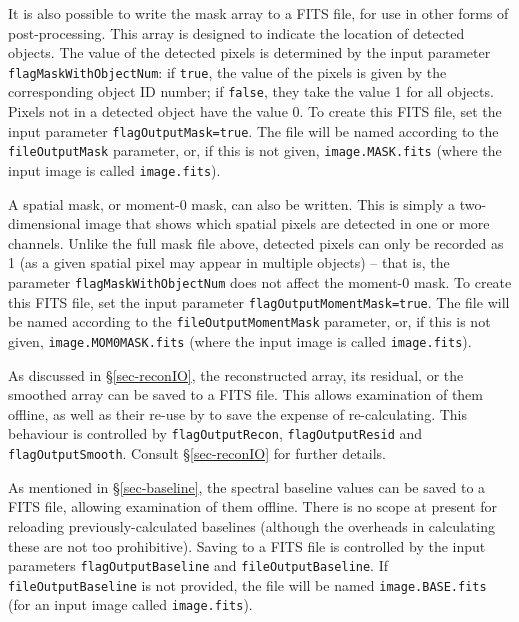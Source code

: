 \label{sec-maskOut}

It is also possible to write the mask array to a FITS file, for use in
other forms of post-processing. This array is designed to indicate the
location of detected objects. The value of the detected pixels is
determined by the input parameter \texttt{flagMaskWithObjectNum}: if
\texttt{true}, the value of the pixels is given by the corresponding
object ID number; if \texttt{false}, they take the value 1 for all
objects. Pixels not in a detected object have the value 0. To create
this FITS file, set the input parameter
\texttt{flagOutputMask=true}. The file will be named according to the
\texttt{fileOutputMask} parameter, or, if this is not given,
\texttt{image.MASK.fits} (where the input image is called
\texttt{image.fits}).

A spatial mask, or moment-0 mask, can also be written. This is simply
a two-dimensional image that shows which spatial pixels are detected
in one or more channels. Unlike the full mask file above, detected
pixels can only be recorded as 1 (as a given spatial pixel may appear
in multiple objects) -- that is, the parameter
\texttt{flagMaskWithObjectNum} does not affect the moment-0 mask. To
create this FITS file, set the input parameter
\texttt{flagOutputMomentMask=true}. The file will be named according
to the \texttt{fileOutputMomentMask} parameter, or, if this is not
given, \texttt{image.MOM0MASK.fits} (where the input image is called
\texttt{image.fits}).

\label{sec-reconOut}

As discussed in \S\ref{sec-reconIO}, the reconstructed array, its
residual, or the smoothed array can be saved to a FITS file. This
allows examination of them offline, as well as their re-use by
\duchamp to save the expense of re-calculating. This behaviour is
controlled by \texttt{flagOutputRecon}, \texttt{flagOutputResid} and
\texttt{flagOutputSmooth}. Consult \S\ref{sec-reconIO} for further
details.

\label{sec-baselineOut}

As mentioned in \S\ref{sec-baseline}, the spectral baseline values can
be saved to a FITS file, allowing examination of them offline. There
is no scope at present for reloading previously-calculated baselines
(although the overheads in calculating these are not too
prohibitive). Saving to a FITS file is controlled by the input
parameters \texttt{flagOutputBaseline} and
\texttt{fileOutputBaseline}. If \texttt{fileOutputBaseline} is not
provided, the file will be named \texttt{image.BASE.fits} (for an
input image called \texttt{image.fits}).



